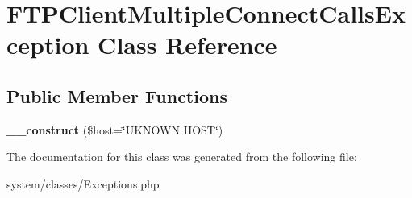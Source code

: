 \hypertarget{class_f_t_p_client_multiple_connect_calls_exception}{
\section{FTPClientMultipleConnectCallsException Class Reference}
\label{class_f_t_p_client_multiple_connect_calls_exception}
}
\subsection*{Public Member Functions}
\begin{DoxyCompactItemize}
\item 
\hypertarget{class_f_t_p_client_multiple_connect_calls_exception_a37c123f3e98a531b21d12984f8e28821}{
{\bfseries \_\-\_\-construct} (\$host=\char`\"{}UKNOWN HOST\char`\"{})}
\label{class_f_t_p_client_multiple_connect_calls_exception_a37c123f3e98a531b21d12984f8e28821}

\end{DoxyCompactItemize}


The documentation for this class was generated from the following file:\begin{DoxyCompactItemize}
\item 
system/classes/Exceptions.php\end{DoxyCompactItemize}
